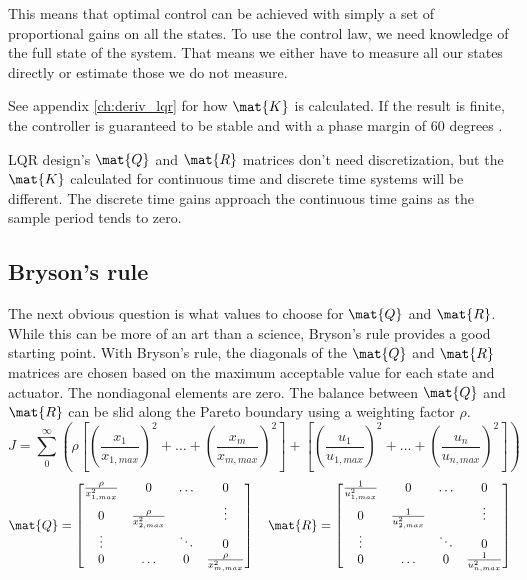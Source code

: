 This means that optimal control can be achieved with simply a set of
proportional gains on all the \glspl{state}. To use the \gls{control law}, we
need knowledge of the full \gls{state} of the \gls{system}. That means we either
have to measure all our \glspl{state} directly or estimate those we do not
measure.

See appendix \ref{ch:deriv_lqr} for how $\mat{K}$ is calculated. If the result
is finite, the controller is guaranteed to be stable and
 with a \gls{phase margin} of 60 degrees
\cite{bib:lqr_phase_margin}.
\begin{remark}
  LQR design's $\mat{Q}$ and $\mat{R}$ matrices don't need \gls{discretization},
  but the $\mat{K}$ calculated for continuous time and discrete time
  \glspl{system} will be different. The discrete time gains approach the
  continuous time gains as the sample period tends to zero.
\end{remark}

\subsection{Bryson's rule}

The next obvious question is what values to choose for $\mat{Q}$ and $\mat{R}$.
While this can be more of an art than a science, Bryson's rule provides a good
starting point. With Bryson's rule, the diagonals of the $\mat{Q}$ and $\mat{R}$
matrices are chosen based on the maximum acceptable value for each \gls{state}
and actuator. The nondiagonal elements are zero. The balance between $\mat{Q}$
and $\mat{R}$ can be slid along the Pareto boundary using a weighting factor
$\rho$.
\begin{equation*}
  J = \sum_0^\infty \left(\rho \left[
    \left(\frac{x_1}{x_{1,max}}\right)^2 + \ldots +
    \left(\frac{x_m}{x_{m,max}}\right)^2\right] + \left[
    \left(\frac{u_1}{u_{1,max}}\right)^2 + \ldots +
    \left(\frac{u_n}{u_{n,max}}\right)^2\right]\right)
\end{equation*}
\begin{equation*}
  \mat{Q} = \begin{bmatrix}
    \frac{\rho}{x_{1,max}^2} & 0 & \ldots & 0 \\
    0 & \frac{\rho}{x_{2,max}^2} & & \vdots \\
    \vdots & & \ddots & 0 \\
    0 & \ldots & 0 & \frac{\rho}{x_{m,max}^2}
  \end{bmatrix}
  \quad
  \mat{R} = \begin{bmatrix}
    \frac{1}{u_{1,max}^2} & 0 & \ldots & 0 \\
    0 & \frac{1}{u_{2,max}^2} & & \vdots \\
    \vdots & & \ddots & 0 \\
    0 & \ldots & 0 & \frac{1}{u_{n,max}^2}
  \end{bmatrix}
\end{equation*}

